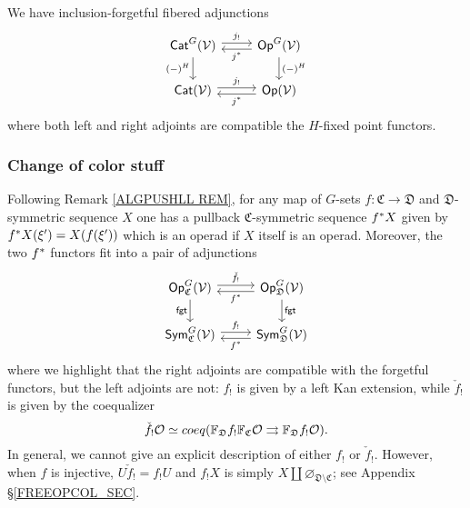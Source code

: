 \documentclass[a4paper,10pt
,draft
]{article}%
\renewcommand{\1}{\eta}%
\begin{document}
\begin{remark}
We have inclusion-forgetful fibered adjunctions
\begin{equation}\label{JSTAR_CAT_EQ}
\begin{tikzcd}
	\Cat^{G}(\V)
	\arrow[shift left]{r}{j_!}
	\arrow[d, "{(-)^H}"']
&
	\Op^{G}(\V)
	\arrow[shift left]{l}{j^{\**}}
	\arrow{d}{(-)^H}
\\
	\Cat(\V)
	\arrow[shift left]{r}{j_!}
&
	\Op(\V)
	\arrow[shift left]{l}{j^{\**}}
\end{tikzcd}
\end{equation}
where both left and right adjoints are compatible the $H$-fixed point functors.
\end{remark}


\subsubsection{Change of color stuff}

\begin{remark}\label{OP_MAP REM}
      Following Remark \ref{ALGPUSHLL REM},
      for any map of $G$-sets $f \colon \mathfrak C \to \mathfrak D$
      and $\mathfrak D$-symmetric sequence $X$
      one has a pullback $\mathfrak C$-symmetric sequence $f^{\**}X$
      given by
      $ f^{\**}X(\xi') = X(f(\xi'))$
      which is an operad if $X$ itself is an operad.
      Moreover, the two $f^{\**}$ functors fit into a pair of adjunctions 
      \begin{equation}\label{GC_CHANGE_EQ}
            \begin{tikzcd}
                  \Op^G_{\mathfrak C}(\V) 
                  \arrow[shift left]{r}{\check{f}_!}
                  \arrow[d, "\mathsf{fgt}"']
                  &
                  \Op^G_{\mathfrak D}(\V) 
                  \arrow[shift left]{l}{f^{\**}}
                  \arrow[d, "\mathsf{fgt}"]
                  \\
                  \Sym^G_{\mathfrak C}(\V) 
                  \arrow[shift left]{r}{f_!}
                  &
                  \Sym^G_{\mathfrak D}(\V) 
                  \arrow[shift left]{l}{f^{\**}}
            \end{tikzcd}
      \end{equation}
      where we highlight that
      the right adjoints are compatible with the forgetful functors, but the left adjoints are not:
      $f_!$ is given by a left Kan extension, while $\check{f}_!$ is given by the coequalizer
      \begin{equation}
            \label{CFS_EQ}
            \check{f_!} \mathcal{O} \simeq \mathop{coeq}(\mathbb F_{\mathfrak D} f_! \mathbb F_{\mathfrak C}\mathcal{O} \rightrightarrows \mathbb F_{\mathfrak D} f_! \mathcal{O}).
      \end{equation}
      In general, we cannot give an explicit description of either $f_!$ or $\check f_!$.
      However, when $f$ is injective, $U \check f_! = f_! U$ and $f_!X$ is simply $X \amalg \varnothing_{\mathfrak D \setminus \mathfrak C}$;
      see Appendix \S \ref{FREEOPCOL_SEC}.
\end{remark}
\end{document}
